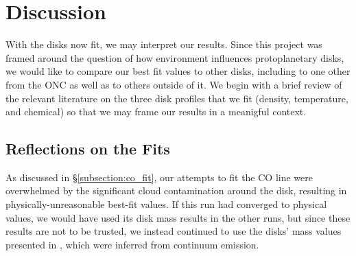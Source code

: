 \chapter{Discussion}
\label{chap:discussion}





With the disks now fit, we may interpret our results. Since this project was framed around the question of how environment influences protoplanetary disks, we would like to compare our best fit values to other disks, including to one other from the ONC \citep{Factor2017} as well as to others outside of it. We begin with a brief review of the relevant literature on the three disk profiles that we fit (density, temperature, and chemical) so that we may frame our results in a meanigful context.




\section{Reflections on the Fits}

As discussed in \S\ref{subsection:co_fit}, our attempts to fit the CO line were overwhelmed by the significant cloud contamination around the disk, resulting in physically-unreasonable best-fit values. If this run had converged to physical values, we would have used its disk mass results in the other runs, but since these results are not to be trusted, we instead continued to use the disks' mass values presented in \citet{Williams2014}, which were inferred from continuum emission.

